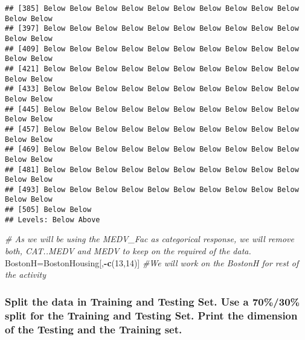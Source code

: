 \documentclass[
]{article}
\newenvironment{Shaded}{\begin{snugshade}}{\end{snugshade}}
\newcommand{\CommentTok}[1]{\textcolor[rgb]{0.56,0.35,0.01}{\textit{#1}}}
\newcommand{\DecValTok}[1]{\textcolor[rgb]{0.00,0.00,0.81}{#1}}
\newcommand{\DocumentationTok}[1]{\textcolor[rgb]{0.56,0.35,0.01}{\textbf{\textit{#1}}}}
\newcommand{\FloatTok}[1]{\textcolor[rgb]{0.00,0.00,0.81}{#1}}
\newcommand{\FunctionTok}[1]{\textcolor[rgb]{0.13,0.29,0.53}{\textbf{#1}}}
\newcommand{\NormalTok}[1]{#1}
\newcommand{\OtherTok}[1]{\textcolor[rgb]{0.56,0.35,0.01}{#1}}
\newcommand{\SpecialCharTok}[1]{\textcolor[rgb]{0.81,0.36,0.00}{\textbf{#1}}}
\begin{document}
\begin{verbatim}
## [385] Below Below Below Below Below Below Below Below Below Below Below Below
## [397] Below Below Below Below Below Below Below Below Below Below Below Below
## [409] Below Below Below Below Below Below Below Below Below Below Below Below
## [421] Below Below Below Below Below Below Below Below Below Below Below Below
## [433] Below Below Below Below Below Below Below Below Below Below Below Below
## [445] Below Below Below Below Below Below Below Below Below Below Below Below
## [457] Below Below Below Below Below Below Below Below Below Below Below Below
## [469] Below Below Below Below Below Below Below Below Below Below Below Below
## [481] Below Below Below Below Below Below Below Below Below Below Below Below
## [493] Below Below Below Below Below Below Below Below Below Below Below Below
## [505] Below Below
## Levels: Below Above
\end{verbatim}

\begin{Shaded}
\begin{Highlighting}[]
\CommentTok{\# As we will be using the MEDV\_Fac as categorical response, we will remove both, \textasciigrave{}CAT..MEDV\textquotesingle{} and \textasciigrave{}MEDV\textquotesingle{} to keep on the required of the data. }
\NormalTok{BostonH}\OtherTok{=}\NormalTok{BostonHousing[,}\SpecialCharTok{{-}}\FunctionTok{c}\NormalTok{(}\DecValTok{13}\NormalTok{,}\DecValTok{14}\NormalTok{)] }
\CommentTok{\#We will work on the BostonH for rest of the activity}
\end{Highlighting}
\end{Shaded}

\hypertarget{split-the-data-in-training-and-testing-set.-use-a-7030-split-for-the-training-and-testing-set.-print-the-dimension-of-the-testing-and-the-training-set.}{%
\subsubsection{Split the data in Training and Testing Set. Use a
70\%/30\% split for the Training and Testing Set. Print the dimension of
the Testing and the Training
set.}\label{split-the-data-in-training-and-testing-set.-use-a-7030-split-for-the-training-and-testing-set.-print-the-dimension-of-the-testing-and-the-training-set.}}

\begin{Shaded}
\end{Shaded}
\end{document}
